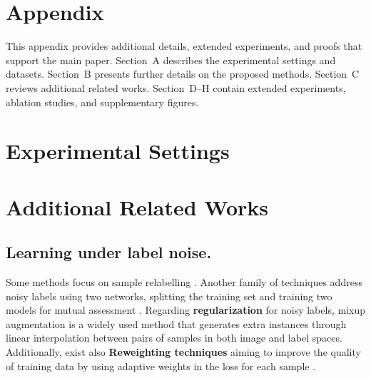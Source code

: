 
\onecolumn 
\section{Appendix}
This appendix provides additional details, extended experiments, and proofs that support the main paper. Section~A describes the experimental settings and datasets. Section~B presents further details on the proposed methods. Section~C reviews additional related works. Section~D–H contain extended experiments, ablation studies, and supplementary figures.
\section{ Experimental Settings} 
 


\section{Additional Related Works}
\label{sec:additional_related}
\subsection{Learning under label noise.}
\label{sec:learningundernoise}
Some methods focus on sample relabelling \cite{arazo2019unsupervised, reed2014training}.
Another family of techniques address noisy labels using two networks, splitting the training set and training two models for mutual assessment \cite{han2018co, li2020dividemix, kim2023crosssplit}. 
Regarding \textbf{regularization} for noisy labels, mixup augmentation \cite{mixup} is a widely used method that generates extra instances through linear interpolation between pairs of samples in both image and label spaces. Additionally, exist also \textbf{Reweighting techniques} aiming to improve the quality of training data by using adaptive weights in the loss for each sample \cite{liu2015classification, pleiss2020identifying}.

